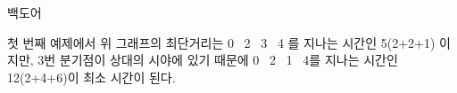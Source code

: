 \begin{problem}{백도어}
    \Examples
    
    \begin{example}
    \end{example}
    
    \Explanation
    
    첫 번째 예제에서 위 그래프의 최단거리는 0 \textrightarrow\ 2 \textrightarrow\ 3 \textrightarrow\ 4 를 지나는 시간인 5(2+2+1) 이지만, 3번 분기점이 상대의 시야에 있기 때문에 0 \textrightarrow\ 2 \textrightarrow\ 1 \textrightarrow\ 4를 지나는 시간인 12(2+4+6)이 최소 시간이 된다.
    
\end{problem}

